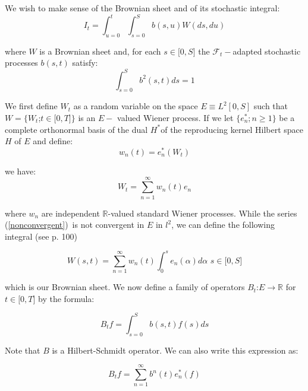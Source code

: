 \documentclass{article}
\begin{document}
\bigskip

We wish to make sense of the Brownian sheet and of its stochastic integral:%
\begin{equation}
I_{t}=\int_{u=0}^{t}\int_{s=0}^{S}b(s,u)W(ds,du)  \label{continuous}
\end{equation}%
\bigskip

where $W$ is a Brownian sheet and, for each $s\in \lbrack 0,S]$ the $%
\mathcal{F}_{t}-$adapted stochastic processes $b(s,t)$ satisfy:%
\begin{equation*}
\int_{s=0}^{S}b^{2}(s,t)ds=1
\end{equation*}

We first define $W_{t}$ as a random variable on the space $E\equiv L^{2}[0,S]
$ such that $W=\{W_{t}$;$t\in \lbrack 0,T]\}$ is an $E-$ valued Wiener
process. If we let $\{e_{n}^{\ast };n\geq 1\}$ be a complete orthonormal
basis of the dual $H^{\ast }$of the reproducing kernel Hilbert space $H$ of $%
E$ and define:%
\begin{equation*}
w_{n}(t)=e_{n}^{\ast }(W_{t})
\end{equation*}

we have:%
\begin{equation}
W_{t}=\sum_{n=1}^{\infty }w_{n}(t)e_{n}  \label{nonconvergent}
\end{equation}

where $w_{n}$ are independent $\mathbb{R}$-valued standard Wiener processes.
While the series (\ref{nonconvergent})\ is not convergent in $E$ in $l^{2}$,
we can define the following integral (see \cite{DPZ92} p. 100)

\begin{equation*}
W(s,t)=\sum_{n=1}^{\infty }w_{n}(t)\int_{0}^{s}e_{n}(\alpha )d\alpha \text{
\ \ }s\in \lbrack 0,S]
\end{equation*}

which is our Brownian sheet. We now define a family of operators $B_{t}$:$%
E\rightarrow \mathbb{R}$ for $t\in \lbrack 0,T]$ by the formula:

\begin{equation*}
B_{t}f=\int_{s=0}^{S}b(s,t)f(s)ds
\end{equation*}

Note that $B$ is a Hilbert-Schmidt operator. We can also write this
expression as:

\begin{equation*}
B_{t}f=\sum_{n=1}^{\infty }b^{n}(t)e_{n}^{\ast }(f)
\end{equation*}
\end{document}
